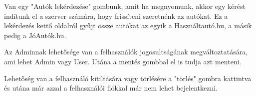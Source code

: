 Van egy "Autók lekérdezése" gombunk, amit ha megnyomunk,  akkor egy kérést indítunk el a szerver számára, hogy frissíteni szeretnénk az autókat. Ez a lekérdezés kettő oldalról gyűjt össze autókat az egyik a Használtautó.hu, a másik pedig a JóAutók.hu.

Az Adminnak lehetősége van a felhasználók jogosultságának megváltoztatására, ami lehet Admin vagy User. Utána a mentés gombbal el is tudja azt menteni.

Lehetőség van a felhasználó kitiltására vagy törlésére a "törlés" gombra kattintva és utána már azzal a felhasználói fiókkal már nem lehet bejelentkezni.


